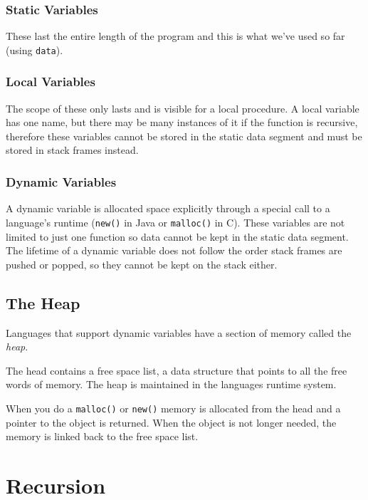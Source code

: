 \subsubsection{Static Variables}\label{ssub:static_variables}

These last the entire length of the program and this is what we've used so far (using \texttt{data}).

\subsubsection{Local Variables}\label{ssub:local_variables}

The scope of these only lasts and is visible for a local procedure.
A local variable has one name, but there may be many instances of it if the function is recursive, therefore these variables cannot be stored in the static data segment and must be stored in stack frames instead.

\subsubsection{Dynamic Variables}\label{ssub:dynamic_variables}

A dynamic variable is allocated space explicitly through a special call to a language's runtime (\texttt{new()} in Java or \texttt{malloc()} in C).
These variables are not limited to just one function so data cannot be kept in the static data segment.
The lifetime of a dynamic variable does not follow the order stack frames are pushed or popped, so they cannot be kept on the stack either.

\subsection{The Heap}\label{sub:the_heap}

Languages that support dynamic variables have a section of memory called the \emph{heap}.

The head contains a free space list, a data structure that points to all the free words of memory.
The heap is maintained in the languages runtime system.

When you do a \texttt{malloc()} or \texttt{new()} memory is allocated from the head and a pointer to the object is returned.
When the object is not longer needed, the memory is linked back to the free space list.

\section{Recursion}\label{sec:recursion}


